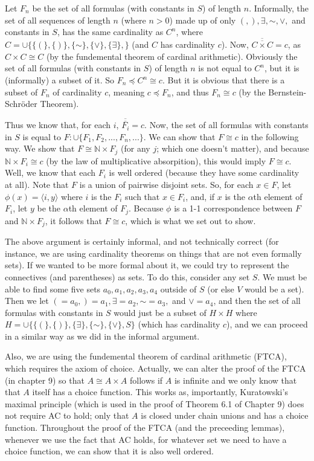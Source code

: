 \documentclass{article}
\newcommand*{\oldneg}{\mathord{\sim}}
\theoremstyle{definition}
\begin{document}
Let $F_n$ be the set of all formulas (with constants in $S$) of length $n$.
Informally, the set of all sequences of length $n$ (where $n>0$) made up of only $(,),\exists,\oldneg,\vee,$ and constants in $S$, 
has the same cardinality as $C^n$, where $C=\cup\{\{(\},\{)\},\{\oldneg\},\{\vee\},\{\exists\},\}$ (and $C$ has cardinality $c$). 
Now, $\overline{\overline{C\times C}}=c$, 
as $C\times C\cong C$ (by the fundemental theorem of cardinal arithmetic). Obviously the set of all formulas (with constants in $S$) 
of length $n$ is not equal to $C^n$, but it is (informally) a subset of it. So $F_n\preceq C^n\cong c$. But it is obvious that 
there is a subset of $F_n$ of cardinality $c$, meaning $c\preceq F_n$, and thus $F_n\cong c$ (by the Bernstein-Schröder Theorem).

Thus we know that, for each $i$, $\overline{\overline{F_i}}=c$. 
Now, the set of all formulas with constants in $S$ is equal to $F:\cup\{F_1,F_2,...,F_n,...\}$. We can show that 
$F\cong c$ in the following way. We show that $F\cong\mathbb{N}\times F_j$ (for any $j$; which one doesn't matter), and 
because $\mathbb{N}\times F_i\cong c$ (by the law of multiplicative absorpition), this would imply 
$F\cong c$. Well, we know that each 
$F_i$ is well ordered (because they have some cardinality at all). Note that $F$ is a union of pairwise disjoint sets. 
So, for each $x\in F$, let $\phi(x)=\langle i,y\rangle$ where $i$ is the $F_i$ such that $x\in F_i$, and, if 
$x$ is the $\alpha$th element of $F_i$, let $y$ be the $\alpha$th element of $F_j$. Because $\phi$ is a 1-1 
correspondence between $F$ and $\mathbb{N}\times F_j$, it follows that $F\cong c$, which is what we set out to show.

The above argument is certainly informal, and not technically correct (for instance, we are using cardinality theorems on things that 
are not even formally sets). If we wanted to be more formal about it, we could try to represent the connectives (and parentheses) as sets.
To do this, consider any set $S$. We must be able to find some five sets $a_0,a_1,a_2,a_3,a_4$ outside of $S$ (or else $V$ would be a set). 
Then we let $(=a_0,)=a_1,\exists=a_2,\oldneg=a_3,$ and $\vee=a_4$, and then the set of all formulas with constants in $S$ would just be 
a subset of $H\times H$ where $H=\cup\{\{(\},\{)\},\{\exists\},\{\oldneg\},\{\vee\},S\}$ (which has cardinality $c$), 
and we can proceed in a similar way as we did in the informal argument.

Also, we are using the fundemental theorem of cardinal arithmetic (FTCA), which requires the axiom of choice. 
Actually, we can alter the proof of the FTCA (in chapter 9) so that $A\cong A\times A$ follows if 
$A$ is infinite and we only know that that $A$ itself has a choice function. This works as, importantly, 
Kuratowski's maximal principle (which is used in the proof of Theorem 6.1 of Chapter 9) does not require 
AC to hold; only that $A$ is closed under chain unions and has a choice function. Throughout the proof of 
the FTCA (and the preceeding lemmas), whenever we use the fact that AC holds, for whatever set 
we need to have a choice function, we can show that it is also well ordered. 
\end{document}
